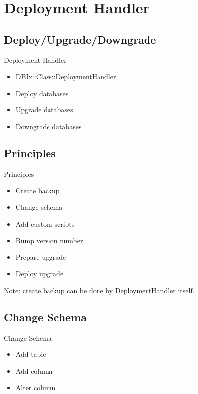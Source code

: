 
\section{Deployment Handler}

\subsection{Deploy/Upgrade/Downgrade}

\begin{frame}{Deployment Handler}
\begin{itemize}
\item DBIx::Class::DeploymentHandler
\item Deploy databases
\item Upgrade databases
\item Downgrade databases
\end{itemize}
\end{frame}

\subsection{Principles}

\begin{frame}{Principles}
\begin{itemize}
\item Create backup
\item Change schema
\item Add custom scripts
\item Bump version number
\item Prepare upgrade
\item Deploy upgrade
\end{itemize}
\end{frame}

Note: create backup can be done by DeploymentHandler itself.

\subsection{Change Schema}

\begin{frame}{Change Schema}
\begin{itemize}
\item Add table
\item Add column
\item Alter column
\end{itemize}
\end{frame}

